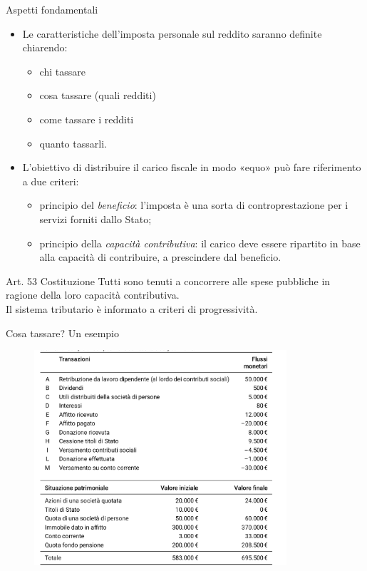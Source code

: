 \documentclass[aspectratio=64,11pt]{beamer}
\newcommand\€{\,\text{€}}
\begin{document}
\begin{frame}{Aspetti fondamentali}
\begin{itemize}
\item Le caratteristiche dell'imposta personale sul reddito saranno definite chiarendo:
\begin{itemize}
\item chi tassare
\item cosa tassare (quali redditi)
\item come tassare i redditi
\item quanto tassarli.
\end{itemize}
\item L'obiettivo di distribuire il carico fiscale in modo «equo» può fare riferimento a due criteri:
\begin{itemize}
\item principio del \emph{beneficio}: l'imposta è una sorta di controprestazione per i servizi forniti dallo Stato;
\item principio della \emph{capacità contributiva}: il carico deve essere ripartito in base alla capacità di contribuire, a prescindere dal beneficio.
\end{itemize}
\end{itemize}
\begin{block}{Art. 53 Costituzione}
Tutti  sono  tenuti  a  concorrere  alle spese pubbliche in ragione della loro capacità contributiva.\\[0pt]
Il sistema tributario è informato a criteri di progressività.
\end{block}
\end{frame}

\begin{frame}{Cosa tassare? Un esempio}
\begin{figure}
\centering
\includegraphics[height=8cm]{./figure/esempio-reddito-patrimonio.png}
\end{figure}
\end{frame}
\end{document}
